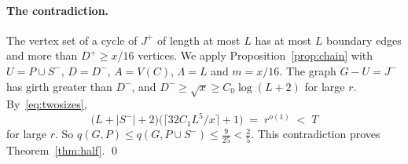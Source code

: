 \paragraph{The contradiction.}
The vertex set of a cycle of $J^{+}$ of length at most $L$ has at most $L$ boundary edges and more
than $D^{+}\ge x/16$ vertices. We apply Proposition~\ref{prop:chain} with $U=P\cup S^{-}$,
$D=D^{-}$, $A=V(C)$, $\Lambda=L$ and $m=x/16$. The graph $G-U=J^{-}$ has girth greater than
$D^{-}$, and $D^{-}\ge\sqrt x\ge C_0\log(L+2)$ for large $r$. By~\eqref{eq:twosizes},
\[
  \bigl(L+|S^{-}|+2\bigr)\bigl(\lceil32C_1L^{5}/x\rceil+1\bigr)\;=\;r^{o(1)}\;<\;T
\]
for large $r$. So $q(G,P)\le q(G,P\cup S^{-})\le\frac9{25}<\frac25$. This contradiction proves
Theorem~\ref{thm:half}. \qed
